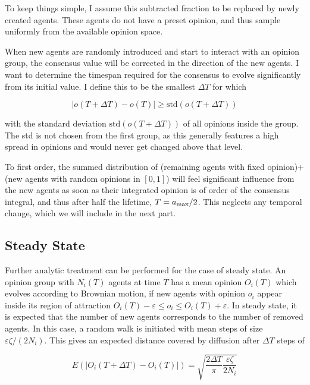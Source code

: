 \documentclass[useAMS,usenatbib]{templates/mn2e}
\begin{document}
To keep things simple, I assume this subtracted fraction to be replaced by newly
created agents. These agents do not have a preset opinion, and thus
sample uniformly from the available opinion space.

When new agents are randomly introduced and start to interact with an
opinion group, the consensus value will be corrected in the direction
of the new agents. I want to determine the timespan required for the
consensus to evolve significantly from its initial value. I define
this to be the smallest $\Delta T$ for which

\begin{equation}
    |o(T + \Delta T) - o(T)| \geq \text{std}(o(T+\Delta T))
\end{equation}

with the standard deviation $\text{std}(o(T+\Delta T))$ of all opinions inside
the group. The std is not chosen from the first group, as this
generally features a high spread in opinions and would never get
changed above that level.

To first order, the summed distribution of (remaining agents with fixed opinion)+(new
agents with random opinions in $[0,1]$) will
feel significant influence from the new agents as soon as their
integrated opinion is of order of the consensus integral, and thus
after half the lifetime, $T=a_{\rm max}/2$. This neglects any temporal
change, which we will include in the next part.

\subsection{Steady State}

Further analytic treatment can be performed for the case of steady state. An
opinion group with $N_i(T)$ agents at time $T$ has a mean
opinion $O_i(T)$ which evolves according to Brownian motion, if new agents
with opinion $o_i$ appear inside its region of attraction $O_i(T)-\varepsilon \leq o_i
\leq O_i(T)+\varepsilon$. In steady state, it is expected that the
number of new agents corresponds to the number of removed agents. In
this case, a random walk is initiated with mean
steps of size $\varepsilon \zeta /(2 N_i)$. This gives an expected distance
covered by diffusion after $\Delta T$ steps of

\begin{equation}
    E(|O_i(T+\Delta T)-O_i(T)|) = \sqrt{\frac{2\Delta T}{\pi}\frac{\varepsilon \zeta}{2 N_i}}
\end{equation}
\end{document}
